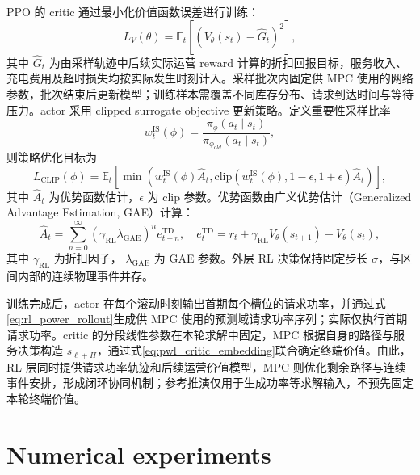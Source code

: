 \documentclass[12pt,a4paper,UTF8]{ctexart}
\begin{document}
PPO 的 critic 通过最小化价值函数误差进行训练：
\begin{equation}
L_V(\theta)=
\mathbb{E}_t\left[
\left(V_{\theta}(s_t)-\hat{G}_t\right)^2
\right],
\label{eq:value_loss}
\end{equation}
其中 $\hat{G}_t$ 为由采样轨迹中后续实际运营 reward 计算的折扣回报目标，服务收入、充电费用及超时损失均按实际发生时刻计入。采样批次内固定供 MPC 使用的网络参数，批次结束后更新模型；训练样本需覆盖不同库存分布、请求到达时间与等待压力。actor 采用 clipped surrogate objective 更新策略。定义重要性采样比率
\begin{equation}
w_t^{\mathrm{IS}}(\phi)=
\frac{\pi_{\phi}(a_t\mid s_t)}{\pi_{\phi_{old}}(a_t\mid s_t)},
\label{eq:ppo_ratio}
\end{equation}
则策略优化目标为
\begin{equation}
L_{\mathrm{CLIP}}(\phi)=
\mathbb{E}_t\left[
\min\left(
w_t^{\mathrm{IS}}(\phi)\hat{A}_t,
\mathrm{clip}(w_t^{\mathrm{IS}}(\phi),1-\epsilon,1+\epsilon)\hat{A}_t
\right)
\right],
\label{eq:ppo_clip}
\end{equation}
其中 $\hat{A}_t$ 为优势函数估计，$\epsilon$ 为 clip 参数。优势函数由广义优势估计（Generalized Advantage Estimation, GAE）计算：
\begin{equation}
\hat{A}_t=\sum_{n=0}^{\infty}
(\gamma_{\mathrm{RL}}\lambda_{\mathrm{GAE}})^n
e_{t+n}^{\mathrm{TD}},
\quad
e_t^{\mathrm{TD}}=r_t
+\gamma_{\mathrm{RL}}V_{\theta}(s_{t+1})-V_{\theta}(s_t),
\label{eq:gae}
\end{equation}
其中 $\gamma_{\mathrm{RL}}$ 为折扣因子，
$\lambda_{\mathrm{GAE}}$ 为 GAE 参数。外层 RL 决策保持固定步长 $\sigma$，与区间内部的连续物理事件并存。

训练完成后，actor 在每个滚动时刻输出首期每个槽位的请求功率，并通过式\eqref{eq:rl_power_rollout}生成供 MPC 使用的预测域请求功率序列；实际仅执行首期请求功率。critic 的分段线性参数在本轮求解中固定，MPC 根据自身的路径与服务决策构造 $s_{\ell+H}$，通过式\eqref{eq:pwl_critic_embedding}联合确定终端价值。由此，RL 层同时提供请求功率轨迹和后续运营价值模型，MPC 则优化剩余路径与连续事件安排，形成闭环协同机制；参考推演仅用于生成功率等求解输入，不预先固定本轮终端价值。


\section{Numerical experiments}

\end{document}

